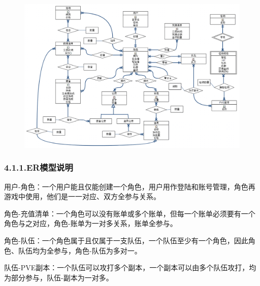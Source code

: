 \documentclass{article}
\begin{document}
\begin{figure}[tbp]%
\begin{mdcenter}%

\noindent{}\includegraphics[keepaspectratio=true,width=\dimwidth{1.00}]{./erd}{}%

\mdhr{}%

\noindent{}%
\end{mdcenter}%
\end{figure}%

\subsubsection{4.1.1.\hspace*{0.5em}ER模型说明}\label{411}%

\noindent{}用户-角色：一个用户能且仅能创建一个角色，用户用作登陆和账号管理，角色再游戏中使用，他们是一一对应、双方全参与关系。%

角色-充值清单：一个角色可以没有账单或多个账单，但每一个账单必须要有一个角色与之对应，角色-账单为一对多关系，账单全参与。%

角色-队伍：一个角色属于且仅属于一支队伍，一个队伍至少有一个角色，因此角色、队伍均为全参与，角色-队伍为多对一。%

队伍-PVE副本：一个队伍可以攻打多个副本，一个副本可以由多个队伍攻打，均为部分参与，队伍-副本为一对多。%
\end{document}
